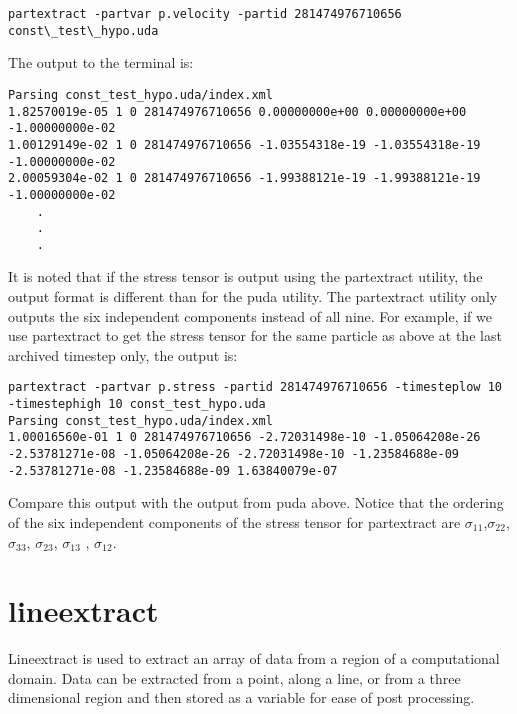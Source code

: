 \begin{Verbatim}[fontsize=\footnotesize]
partextract -partvar p.velocity -partid 281474976710656 const\_test\_hypo.uda
\end{Verbatim}

The output to the terminal is:

\begin{Verbatim}[fontsize=\footnotesize]
Parsing const_test_hypo.uda/index.xml
1.82570019e-05 1 0 281474976710656 0.00000000e+00 0.00000000e+00 -1.00000000e-02
1.00129149e-02 1 0 281474976710656 -1.03554318e-19 -1.03554318e-19 -1.00000000e-02
2.00059304e-02 1 0 281474976710656 -1.99388121e-19 -1.99388121e-19 -1.00000000e-02
	.
	.
	.
\end{Verbatim}

It is noted that if the stress tensor is output using the partextract utility, the output format is different than for the puda utility.  The partextract utility only outputs the six independent components instead of all nine.  For example, if we use partextract to get the stress tensor for the same particle as above at the last archived timestep only, the output is:

\begin{Verbatim}[fontsize=\footnotesize]
partextract -partvar p.stress -partid 281474976710656 -timesteplow 10 -timestephigh 10 const_test_hypo.uda
Parsing const_test_hypo.uda/index.xml
1.00016560e-01 1 0 281474976710656 -2.72031498e-10 -1.05064208e-26 -2.53781271e-08 -1.05064208e-26 -2.72031498e-10 -1.23584688e-09 -2.53781271e-08 -1.23584688e-09 1.63840079e-07
\end{Verbatim}

Compare this output with the output from puda above.  Notice that the ordering of the six independent components of the stress tensor for partextract are $\sigma_{11}$,$\sigma_{22}$, $\sigma_{33}$, $\sigma_{23}$, $\sigma_{13}$ , $\sigma_{12}$.

\section{lineextract}

Lineextract is used to extract an array of data from a region of a computational domain. Data can be extracted from a point, along a line, or from a three dimensional region and then stored as a variable for ease of post processing.

